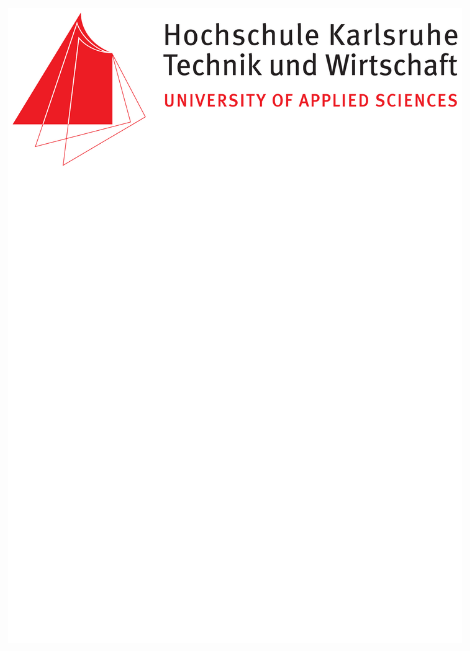\begin{titlepage}

\begin{singlespace}
\begin{center}
\begin{singlespace}
\Large \Titel\\[1.2cm]
\end{singlespace}
\begin{spacing}{2}
{\Huge\scshape \Was}\\
{\Large \WasEng}\\[0.6cm]
\end{spacing}
\end{center}
\end{singlespace}

\begin{flushleft}
	\begin{center}
		\includegraphics[width=12cm]{HSKA_Logo_Hska_Logo.pdf}
	\end{center}
\end{flushleft}


\end{titlepage}
